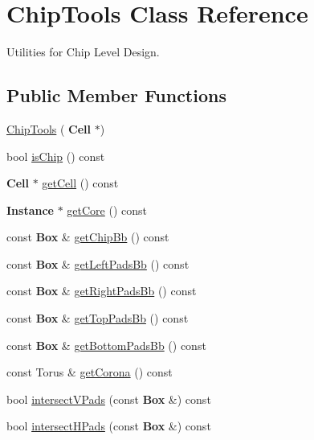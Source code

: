 \hypertarget{classKatabatic_1_1ChipTools}{}\section{Chip\+Tools Class Reference}
\label{classKatabatic_1_1ChipTools}


Utilities for Chip Level Design.  


\subsection*{Public Member Functions}
\begin{DoxyCompactItemize}
\item 
\mbox{\hyperlink{classKatabatic_1_1ChipTools_a5296f5ccb380869255d774b70e237686}{Chip\+Tools}} (\textbf{ Cell} $\ast$)
\item 
bool \mbox{\hyperlink{classKatabatic_1_1ChipTools_ab6b7bc2b47ead460ac00a531451dc9cf}{is\+Chip}} () const
\item 
\textbf{ Cell} $\ast$ \mbox{\hyperlink{classKatabatic_1_1ChipTools_a55a3a88610ef1af9931e634f77f2403b}{get\+Cell}} () const
\item 
\textbf{ Instance} $\ast$ \mbox{\hyperlink{classKatabatic_1_1ChipTools_a8be5c4aecbe9b97ed2eb9557b046b091}{get\+Core}} () const
\item 
const \textbf{ Box} \& \mbox{\hyperlink{classKatabatic_1_1ChipTools_ada9182cc0bcdb47b156a29cf42d08651}{get\+Chip\+Bb}} () const
\item 
const \textbf{ Box} \& \mbox{\hyperlink{classKatabatic_1_1ChipTools_aa6b5ac93ecf1ee9f94f5176664dcf4bf}{get\+Left\+Pads\+Bb}} () const
\item 
const \textbf{ Box} \& \mbox{\hyperlink{classKatabatic_1_1ChipTools_a07e88c4c6a615019e618af327829f4d0}{get\+Right\+Pads\+Bb}} () const
\item 
const \textbf{ Box} \& \mbox{\hyperlink{classKatabatic_1_1ChipTools_ad31ff1dbfdf55216d684b4032a73db6b}{get\+Top\+Pads\+Bb}} () const
\item 
const \textbf{ Box} \& \mbox{\hyperlink{classKatabatic_1_1ChipTools_aad46c56aeb14b07fcdfe93b51c554828}{get\+Bottom\+Pads\+Bb}} () const
\item 
const Torus \& \mbox{\hyperlink{classKatabatic_1_1ChipTools_a19c65013cccd38e5d4169fc25454b938}{get\+Corona}} () const
\item 
bool \mbox{\hyperlink{classKatabatic_1_1ChipTools_a708cdae658a916324059d321fafeaa7d}{intersect\+V\+Pads}} (const \textbf{ Box} \&) const
\item 
bool \mbox{\hyperlink{classKatabatic_1_1ChipTools_aeead79862ba27f1219a3cbb3ef6999d2}{intersect\+H\+Pads}} (const \textbf{ Box} \&) const
\end{DoxyCompactItemize}


